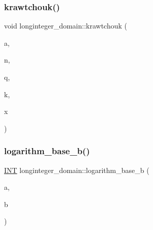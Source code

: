 \mbox{\label{classlonginteger__domain_ade45dc7df38e862586b2ba1b913fb61e}} 
\subsubsection{\texorpdfstring{krawtchouk()}{krawtchouk()}}
{\footnotesize\ttfamily void longinteger\+\_\+domain\+::krawtchouk (\begin{DoxyParamCaption}\item[{\mbox{\hyperlink{classlonginteger__object}{longinteger\+\_\+object}} \&}]{a,  }\item[{\mbox{\hyperlink{galois_8h_a09fddde158a3a20bd2dcadb609de11dc}{I\+NT}}}]{n,  }\item[{\mbox{\hyperlink{galois_8h_a09fddde158a3a20bd2dcadb609de11dc}{I\+NT}}}]{q,  }\item[{\mbox{\hyperlink{galois_8h_a09fddde158a3a20bd2dcadb609de11dc}{I\+NT}}}]{k,  }\item[{\mbox{\hyperlink{galois_8h_a09fddde158a3a20bd2dcadb609de11dc}{I\+NT}}}]{x }\end{DoxyParamCaption})}

\mbox{\label{classlonginteger__domain_a48ced88854ffc8207e85527bf01560ee}} 
\subsubsection{\texorpdfstring{logarithm\+\_\+base\+\_\+b()}{logarithm\_base\_b()}}
{\footnotesize\ttfamily \mbox{\hyperlink{galois_8h_a09fddde158a3a20bd2dcadb609de11dc}{I\+NT}} longinteger\+\_\+domain\+::logarithm\+\_\+base\+\_\+b (\begin{DoxyParamCaption}\item[{\mbox{\hyperlink{classlonginteger__object}{longinteger\+\_\+object}} \&}]{a,  }\item[{\mbox{\hyperlink{galois_8h_a09fddde158a3a20bd2dcadb609de11dc}{I\+NT}}}]{b }\end{DoxyParamCaption})}

\mbox{\label{classlonginteger__domain_afe1bea3b6cf40deb75db9fc54d4f4676}} 
